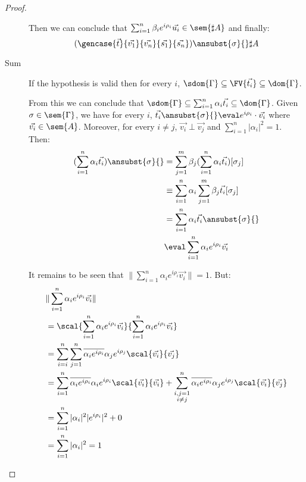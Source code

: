 \begin{proof}
\begin{description}
    Then we can conclude that $\sum_{i=1}^{n}\beta_i e^{i\rho_i}\vec{u_i}\in\sem{\sharp A}$ and finally:
    \[
        (\gencase{\vec{t}}{\vec{v_1}}{\vec{v_n}}{\vec{s_1}}{\vec{s_n}})\ansubst{\sigma}{}\real\sharp A
    \]

    \item[Sum] If the hypothesis is valid then for every $i$, $\sdom{\Gamma}\subseteq\FV{\vec{t_i}}\subseteq\dom{\Gamma}$.
    
    From this we can conclude that $\sdom{\Gamma}\subseteq\sum_{i=1}^{n}\alpha_i \vec{t_i}\subseteq\dom{\Gamma}$. Given $\sigma\in\sem{\Gamma}$, we have for every $i$, $\vec{t_i}\ansubst{\sigma}{}\eval e^{i\rho_i}\cdot\vec{v_i}$ where $\vec{v_i}\in\sem{A}$. Moreover, for every $i\neq j$, $\vec{v_i}\perp\vec{v_j}$ and $\sum_{i=1}^{n}|\alpha_i|^2=1$. Then:
    \begin{align*}
    (\sum_{i=1}^{n}\alpha_i\vec{t_i})\ansubst{\sigma}{} 
    &= \sum_{j=1}^{m}\beta_j(\sum_{i=1}^{n}\alpha_i \vec{t_i})[\sigma_j]\\
    &\equiv \sum_{i=1}^{n} \alpha_i \sum_{j=1}^{m} \beta_j \vec{t_i}[\sigma_j]\\
    &=\sum_{i=1}^{n} \alpha_i \vec{t_i}\ansubst{\sigma}{}\\
    &\eval \sum_{i=1}^{n} \alpha_i e^{i\rho_i} \vec{v_i}\\
    \end{align*}

    It remains to be seen that $\|\sum_{i=1}^{n} \alpha_i e^{i\rho_i} \vec{v_i}\|=1$. But:
    \begin{align*}
    &\|\sum_{i=1}^{n} \alpha_i e^{i\rho_i} \vec{v_i}\| \\
    &=\scal{\sum_{i=1}^{n} \alpha_i e^{i\rho_i}\vec{v_i}}{\sum_{i=1}^{n} \alpha_i e^{i\rho_i} \vec{v_i}}\\
    &= \sum_{i=i}^{n}\sum_{j=1}^{n} \overline{\alpha_i e^{i\rho_i}}\alpha_j e^{i\rho_j} \scal{\vec{v_i}}{\vec{v_j}}\\
    &=\sum_{i=1}^{n} \overline{\alpha_i e^{i\rho_i}}\alpha_i e^{i\rho_i} \scal{\vec{v_i}}{\vec{v_i}} + \sum_{\substack{i,j=1\\i\neq j}}^{n} \overline{\alpha_i e^{i\rho_i}}\alpha_j e^{i\rho_j} \scal{\vec{v_i}}{\vec{v_j}}\\
    &=\sum_{i=1}^{n}|\alpha_i|^2 |e^{i\rho_i}|^2+ 0\\
    &=\sum_{i=1}^{n}|\alpha_i|^2 = 1\\
    \end{align*}


\end{description}
\end{proof}
